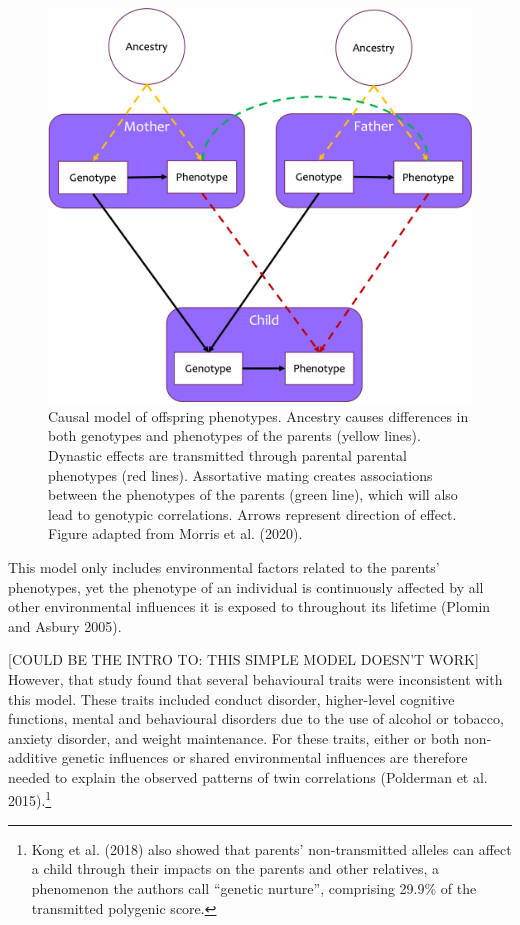 \documentclass[
]{book}
\begin{document}
\begin{figure}
\includegraphics[width=1\linewidth]{figs/introduction/pheno_causal_model} \caption{Causal model of offspring phenotypes. Ancestry causes differences in both genotypes and phenotypes of the parents (yellow lines). Dynastic effects are transmitted through parental parental phenotypes (red lines). Assortative mating creates associations between the phenotypes of the parents (green line), which will also lead to genotypic correlations. Arrows represent direction of effect. Figure adapted from Morris et al. (2020).}\label{fig:pheno-causal-model}
\end{figure}

This model only includes environmental factors related to the parents' phenotypes, yet the phenotype of an individual is continuously affected by all other environmental influences it is exposed to throughout its lifetime (Plomin and Asbury 2005).

{[}COULD BE THE INTRO TO: THIS SIMPLE MODEL DOESN'T WORK{]} However, that study found that several behavioural traits were inconsistent with this model. These traits included conduct disorder, higher-level cognitive functions, mental and behavioural disorders due to the use of alcohol or tobacco, anxiety disorder, and weight maintenance. For these traits, either or both non-additive genetic influences or shared environmental influences are therefore needed to explain the observed patterns of twin correlations (Polderman et al. 2015).\footnote{Kong et al. (2018) also showed that parents' non-transmitted alleles can affect a child through their impacts on the parents and other relatives, a phenomenon the authors call ``genetic nurture'', comprising 29.9\% of the transmitted polygenic score.}
\end{document}
